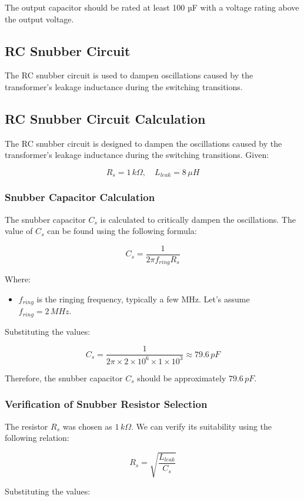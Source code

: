 \documentclass{article}
\begin{document}
The output capacitor should be rated at least 100 µF with a voltage rating above the output voltage.

\subsection{RC Snubber Circuit}
The RC snubber circuit is used to dampen oscillations caused by the transformer's leakage inductance during the switching transitions.

\subsection{RC Snubber Circuit Calculation}
The RC snubber circuit is designed to dampen the oscillations caused by the transformer's leakage inductance during the switching transitions. Given:

\[
R_s = 1 \, k\Omega, \quad L_{leak} = 8 \, \mu H
\]

\subsubsection{Snubber Capacitor Calculation}
The snubber capacitor \( C_s \) is calculated to critically dampen the oscillations. The value of \( C_s \) can be found using the following formula:

\[
C_s = \frac{1}{2 \pi f_{ring} R_s}
\]

Where:
\begin{itemize}
    \item \( f_{ring} \) is the ringing frequency, typically a few MHz. Let's assume \( f_{ring} = 2 \, MHz \).
\end{itemize}

Substituting the values:

\[
C_s = \frac{1}{2 \pi \times 2 \times 10^6 \times 1 \times 10^3} \approx 79.6 \, pF
\]

Therefore, the snubber capacitor \( C_s \) should be approximately \( 79.6 \, pF \).

\subsubsection{Verification of Snubber Resistor Selection}
The resistor \( R_s \) was chosen as \( 1 \, k\Omega \). We can verify its suitability using the following relation:

\[
R_s = \sqrt{\frac{L_{leak}}{C_s}}
\]

Substituting the values:
\end{document}
